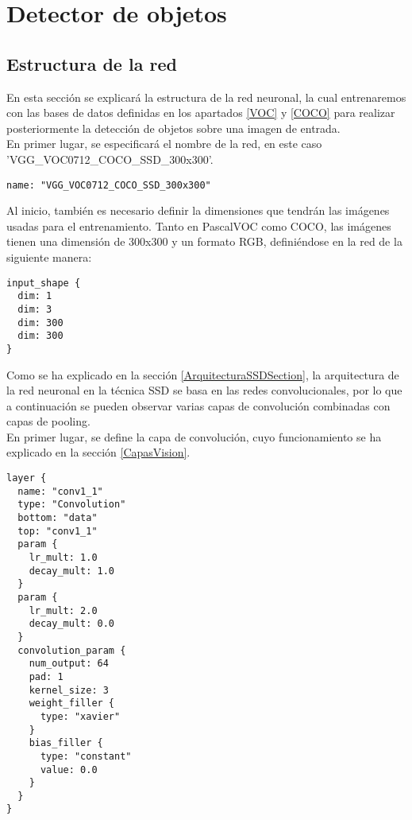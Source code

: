 \documentclass[a4paper, 12pt, spanish, chapterprefix, numbers=noenddot]{book}
\begin{document}
\section{Detector de objetos}

\subsection{Estructura de la red}\label{Estructura}

En esta sección se explicará la estructura de la red neuronal, la cual entrenaremos con las bases de datos definidas en los apartados \ref{VOC} y \ref{COCO} para realizar posteriormente la detección de objetos sobre una imagen de entrada.\\

En primer lugar, se especificará el nombre de la red, en este caso \\'VGG\_VOC0712\_COCO\_SSD\_300x300'.\\

\begin{lstlisting}[frame=single]
name: "VGG_VOC0712_COCO_SSD_300x300"
\end{lstlisting}

Al inicio, también es necesario definir la dimensiones que tendrán las imágenes usadas para el entrenamiento. Tanto en PascalVOC como COCO, las imágenes tienen una dimensión de 300x300 y un formato RGB, definiéndose en la red de la siguiente manera:\\

\begin{lstlisting}[frame=single]
input_shape {
  dim: 1
  dim: 3
  dim: 300
  dim: 300
}
\end{lstlisting}

Como se ha explicado en la sección \ref{ArquitecturaSSDSection}, la arquitectura de la red neuronal en la técnica SSD se basa en las redes convolucionales, por lo que a continuación se pueden observar varias capas de convolución combinadas con capas de pooling.\\

En primer lugar, se define la capa de convolución, cuyo funcionamiento se ha explicado en la sección \ref{CapasVision}.\\

\begin{lstlisting}[frame=single]
layer {
  name: "conv1_1"
  type: "Convolution"
  bottom: "data"
  top: "conv1_1"
  param {
    lr_mult: 1.0
    decay_mult: 1.0
  }
  param {
    lr_mult: 2.0
    decay_mult: 0.0
  }
  convolution_param {
    num_output: 64
    pad: 1
    kernel_size: 3
    weight_filler {
      type: "xavier"
    }
    bias_filler {
      type: "constant"
      value: 0.0
    }
  }
}
\end{lstlisting}
\end{document}
